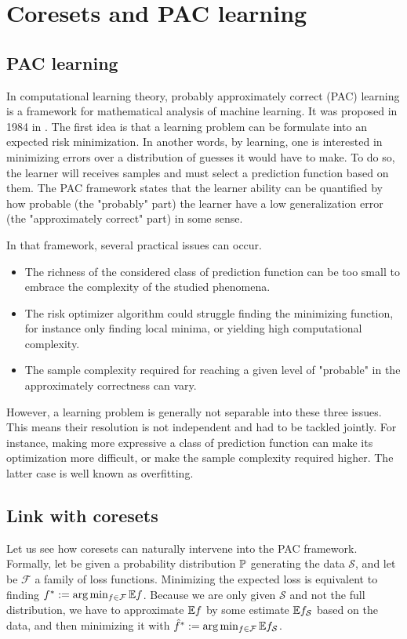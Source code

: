 \section{Coresets and PAC learning}
\subsection{PAC learning
}In computational learning theory, probably approximately correct (PAC) learning is a framework for mathematical analysis of machine learning. It was proposed in 1984 in \cite{valiant1984learnable}. The first idea is that a learning problem can be formulate into an expected risk minimization. In another words, by learning, one is interested in minimizing errors over a distribution of guesses it would have to make. To do so, the learner will receives samples and must select a prediction function based on them. The PAC framework states that the learner ability can be quantified by how probable (the "probably" part) the learner have a low generalization error (the "approximately correct" part) in some sense.



In that framework, several practical issues can occur. 
\begin{itemize}
    \item The richness of the considered class of prediction function can be too small to embrace the complexity of the studied phenomena.
    \item The risk optimizer algorithm could struggle finding the minimizing function, for instance only finding local minima, or yielding high computational complexity.
    \item The sample complexity required for reaching a given level of "probable" in the approximately correctness can vary.
\end{itemize}

However, a learning problem is generally not separable into these three issues. This means their resolution is not independent and had to be tackled jointly. For instance, making more expressive a class of prediction function can make its optimization more difficult, or make the sample complexity required higher. The latter case is well known as overfitting.

\subsection{Link with coresets}

Let us see how coresets can naturally intervene into the PAC framework. Formally, let be given a probability distribution $\mathbb{P}$ generating the data $\mathcal{S}$, and let be $\mathcal{F}$ a family of loss functions. Minimizing the expected loss is equivalent to finding $f^*:= \arg \min_{f\in \mathcal{F}} \mathbb{E} f$. Because we are only given $\mathcal{S}$ and not the full distribution, we have to approximate $\mathbb{E} f$ by some estimate $\mathbb{E} f_{\mathcal{S}}$ based on the data, and then minimizing it with $\hat{f}^* := \arg \min_{f\in \mathcal{F}} \mathbb{E} f_{\mathcal{S}}$. 


